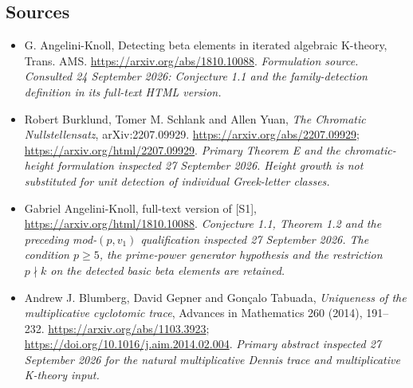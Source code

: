 \documentclass[11pt]{article}
\begin{document}
\subsection{Sources}
\begin{itemize}
\item[S1]G. Angelini-Knoll, Detecting beta elements in iterated algebraic K-theory, Trans. AMS.
\url{https://arxiv.org/abs/1810.10088}.
\textit{Formulation source. Consulted 24 September 2026: Conjecture 1.1 and the family-detection definition in its full-text HTML version.}
\item[E1]Robert Burklund, Tomer M. Schlank and Allen Yuan,
\emph{The Chromatic Nullstellensatz}, arXiv:2207.09929.
\url{https://arxiv.org/abs/2207.09929};
\url{https://arxiv.org/html/2207.09929}.
\textit{Primary Theorem E and the chromatic-height formulation
inspected 27 September 2026. Height growth is not substituted for
unit detection of individual Greek-letter classes.}
\item[E2]Gabriel Angelini-Knoll, full-text version of [S1],
\url{https://arxiv.org/html/1810.10088}.
\textit{Conjecture 1.1, Theorem 1.2 and the preceding mod-$(p,v_1)$
qualification inspected 27 September 2026. The condition $p\geq5$,
the prime-power generator hypothesis and the restriction $p\nmid k$
on the detected basic beta elements are retained.}
\item[E3]Andrew J. Blumberg, David Gepner and Gon\c calo Tabuada,
\emph{Uniqueness of the multiplicative cyclotomic trace}, Advances
in Mathematics 260 (2014), 191--232.
\url{https://arxiv.org/abs/1103.3923};
\url{https://doi.org/10.1016/j.aim.2014.02.004}.
\textit{Primary abstract inspected 27 September 2026 for the natural
multiplicative Dennis trace and multiplicative K-theory input.}
\end{itemize}
\end{document}
